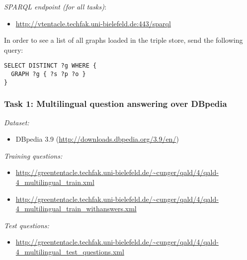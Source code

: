 \documentclass[a4paper]{article}
\begin{document}
{\vspace{.4cm}

{\em SPARQL endpoint (for all tasks)}:
\begin{itemize}
\item[] \url{http://vtentacle.techfak.uni-bielefeld.de:443/sparql}
\end{itemize}
In order to see a list of all graphs loaded in the triple store, send the following query:
\begin{lstlisting}
SELECT DISTINCT ?g WHERE {
  GRAPH ?g { ?s ?p ?o }
}
\end{lstlisting}

\subsubsection*{Task 1: Multilingual question answering over DBpedia}

{\em Dataset:} 

\vspace{-.3cm}

\begin{itemize} 
\item DBpedia 3.9 (\url{http://downloads.dbpedia.org/3.9/en/})
\end{itemize} 

{\em Training questions:} 

\vspace{-.3cm}

\begin{itemize} 
\item \url{http://greententacle.techfak.uni-bielefeld.de/~cunger/qald/4/qald-4_multilingual_train.xml} 
\item \url{http://greententacle.techfak.uni-bielefeld.de/~cunger/qald/4/qald-4_multilingual_train_withanswers.xml}
\end{itemize} 

{\em Test questions:} 

\vspace{-.3cm}

\begin{itemize}
\item \url{http://greententacle.techfak.uni-bielefeld.de/~cunger/qald/4/qald-4_multilingual_test_questions.xml} 
\end{itemize}


}
\end{document}
